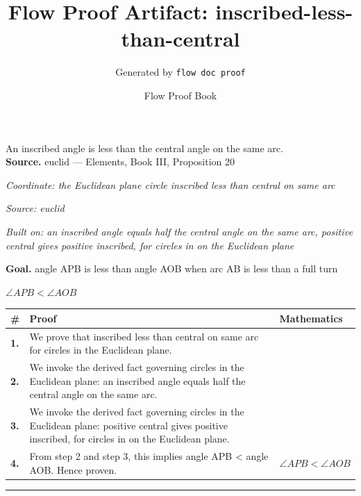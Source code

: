 \documentclass[11pt]{article}
\title{Flow Proof Artifact: inscribed-less-than-central}
\author{Generated by \texttt{flow doc proof}}
\date{Flow Proof Book}
\theoremstyle{definition}
\begin{document}
\maketitle
An inscribed angle is less than the central angle on the same arc.\\[0.5em]
\textbf{Source.} euclid — Elements, Book III, Proposition 20\\[0.5em]
\bigskip
{}\par
\smallskip\noindent\textit{Coordinate: the Euclidean plane \cdot circle \cdot inscribed less than central on same arc}\par
\smallskip\noindent\textit{Source: euclid}\par
\smallskip\noindent\textit{Built on: an inscribed angle equals half the central angle on the same arc, positive central gives positive inscribed, for circles in on the Euclidean plane}\par
\medskip
\noindent\textbf{Goal.} angle APB is less than angle AOB when arc AB is less than a full turn\par
\noindent$\displaystyle \angle APB < \angle AOB$\par
\medskip
\noindent
\begin{tabular}{@{} >{\raggedright\arraybackslash}p{} >{\raggedright\arraybackslash}p{} >{\raggedleft\arraybackslash}p{} @{}}
\textbf{\#} & \textbf{Proof} & \textbf{Mathematics} \\
\midrule
\textbf{1.} & We prove that inscribed less than central on same arc for circles in the Euclidean plane. & \\[0.45em]
\textbf{2.} & We invoke the derived fact governing circles in the Euclidean plane: an inscribed angle equals half the central angle on the same arc. & \\[0.45em]
\textbf{3.} & We invoke the derived fact governing circles in the Euclidean plane: positive central gives positive inscribed, for circles in on the Euclidean plane. & \\[0.45em]
\textbf{4.} & From step 2 and step 3, this implies angle APB < angle AOB. Hence proven. & $\displaystyle \angle APB < \angle AOB$ \\[0.45em]
\bottomrule
\end{tabular}
\label{thm:Geometry-circle-inscribed_less_than_central_on_same_arc}
\par\medskip\hrule
\end{document}
